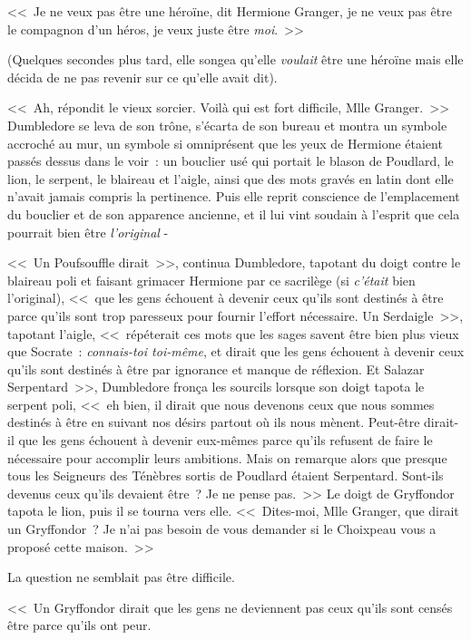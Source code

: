 <<~Je ne veux pas être une héroïne, dit Hermione Granger, je ne veux pas être le compagnon d'un héros, je veux juste être \emph{moi}.~>>

(Quelques secondes plus tard, elle songea qu'elle \emph{voulait} être une héroïne mais elle décida de ne pas revenir sur ce qu'elle avait dit).

<<~Ah, répondit le vieux sorcier. Voilà qui est fort difficile, Mlle Granger.~>> Dumbledore se leva de son trône, s'écarta de son bureau et montra un symbole accroché au mur, un symbole si omniprésent que les yeux de Hermione étaient passés dessus dans le voir~: un bouclier usé qui portait le blason de Poudlard, le lion, le serpent, le blaireau et l'aigle, ainsi que des mots gravés en latin dont elle n'avait jamais compris la pertinence. Puis elle reprit conscience de l'emplacement du bouclier et de son apparence ancienne, et il lui vint soudain à l'esprit que cela pourrait bien être \emph{l'original} -

<<~Un Poufsouffle dirait~>>, continua Dumbledore, tapotant du doigt contre le blaireau poli et faisant grimacer Hermione par ce sacrilège (si \emph{c'était} bien l'original), <<~que les gens échouent à devenir ceux qu'ils sont destinés à être parce qu'ils sont trop paresseux pour fournir l'effort nécessaire. Un Serdaigle~>>, tapotant l'aigle, <<~répéterait ces mots que les sages savent être bien plus vieux que Socrate~: \emph{connais-toi toi-même}, et dirait que les gens échouent à devenir ceux qu'ils sont destinés à être par ignorance et manque de réflexion. Et Salazar Serpentard~>>, Dumbledore fronça les sourcils lorsque son doigt tapota le serpent poli, <<~eh bien, il dirait que nous devenons ceux que nous sommes destinés à être en suivant nos désirs partout où ils nous mènent. Peut-être dirait-il que les gens échouent à devenir eux-mêmes parce qu'ils refusent de faire le nécessaire pour accomplir leurs ambitions. Mais on remarque alors que presque tous les Seigneurs des Ténèbres sortis de Poudlard étaient Serpentard. Sont-ils devenus ceux qu'ils devaient être~? Je ne pense pas.~>> Le doigt de Gryffondor tapota le lion, puis il se tourna vers elle. <<~Dites-moi, Mlle Granger, que dirait un Gryffondor~? Je n'ai pas besoin de vous demander si le Choixpeau vous a proposé cette maison.~>>

La question ne semblait pas être difficile.

<<~Un Gryffondor dirait que les gens ne deviennent pas ceux qu'ils sont censés être parce qu'ils ont peur.

